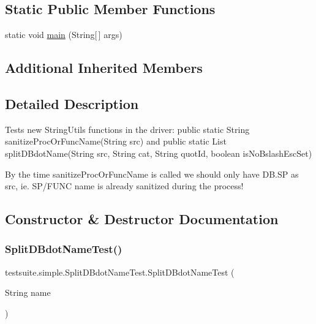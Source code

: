 \subsection*{Static Public Member Functions}
\begin{DoxyCompactItemize}
\item 
static void \mbox{\hyperlink{classtestsuite_1_1simple_1_1_split_d_bdot_name_test_acb8ba7fcbc46d143cfda1afb2530249b}{main}} (String\mbox{[}$\,$\mbox{]} args)
\end{DoxyCompactItemize}
\subsection*{Additional Inherited Members}


\subsection{Detailed Description}
Tests new String\+Utils functions in the driver\+: public static String sanitize\+Proc\+Or\+Func\+Name(\+String src) and public static List split\+D\+Bdot\+Name(String src, String cat, String quot\+Id, boolean is\+No\+Bslash\+Esc\+Set)

By the time sanitize\+Proc\+Or\+Func\+Name is called we should only have D\+B.\+SP as src, ie. S\+P/\+F\+U\+NC name is already sanitized during the process! 

\subsection{Constructor \& Destructor Documentation}
\mbox{\label{classtestsuite_1_1simple_1_1_split_d_bdot_name_test_ac0705ebb305a60c8c7e932f358c79039}} 
\subsubsection{\texorpdfstring{Split\+D\+Bdot\+Name\+Test()}{SplitDBdotNameTest()}}
{\footnotesize\ttfamily testsuite.\+simple.\+Split\+D\+Bdot\+Name\+Test.\+Split\+D\+Bdot\+Name\+Test (\begin{DoxyParamCaption}\item[{String}]{name }\end{DoxyParamCaption})}

